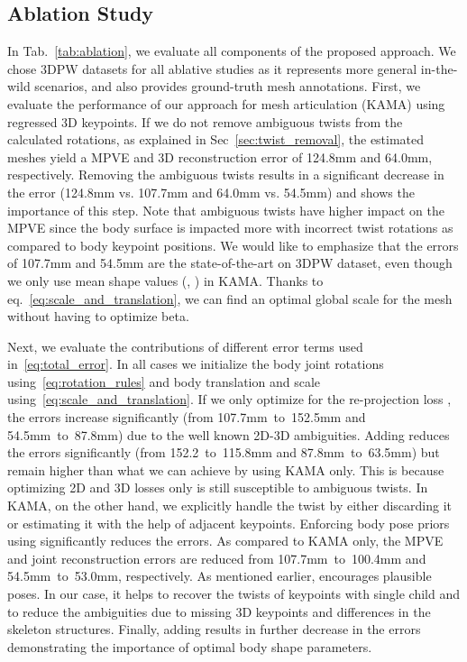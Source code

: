 \subsection{Ablation Study}
In Tab.~\ref{tab:ablation}, we evaluate all components of the proposed approach. We chose 3DPW datasets for all ablative studies as it represents more general in-the-wild scenarios, and also provides ground-truth mesh annotations. First, we evaluate the performance of our approach for mesh articulation (KAMA) using regressed 3D keypoints. If we do not remove ambiguous twists from the calculated rotations, as explained in Sec~\ref{sec:twist_removal}, the estimated meshes yield a MPVE and 3D reconstruction error of 124.8mm and 64.0mm, respectively. Removing the ambiguous twists results in a significant decrease in the error (124.8mm vs. 107.7mm and 64.0mm vs. 54.5mm) and shows the importance of this step. Note that ambiguous twists have higher impact on the MPVE since the body surface is impacted more with incorrect twist rotations as compared to body keypoint positions. We would like to emphasize that the errors of 107.7mm and 54.5mm are the state-of-the-art on 3DPW dataset, even though we only use mean shape values (\ie, ) in KAMA. Thanks to eq.~\eqref{eq:scale_and_translation}, we can find an optimal global scale for the mesh without having to optimize beta. 


Next, we evaluate the contributions of different error terms used in~\eqref{eq:total_error}. In all cases we initialize the body joint rotations using~\eqref{eq:rotation_rules} and body translation and scale using~\eqref{eq:scale_and_translation}. If we only optimize for the re-projection loss , the errors increase significantly (from 107.7mm~to~152.5mm and 54.5mm~to~87.8mm) due to the well known 2D-3D ambiguities. Adding  reduces the errors significantly (from 152.2~to~115.8mm and 87.8mm~to~63.5mm)  but remain higher than what we can achieve by using KAMA only. This is because optimizing 2D and 3D losses only is still susceptible to ambiguous twists. In KAMA, on the other hand, we explicitly handle the twist by either discarding it or estimating it with the help of adjacent keypoints. Enforcing body pose priors using  significantly reduces the errors. As compared to KAMA only, the MPVE and joint reconstruction errors are reduced from 107.7mm~to~100.4mm and 54.5mm~to~53.0mm, respectively.  As mentioned earlier,  encourages plausible poses. In our case, it helps to recover the twists of keypoints with single child and to reduce the ambiguities due to missing 3D keypoints and differences in the skeleton structures. Finally, adding  results in further decrease in the errors demonstrating the importance of optimal body shape parameters. 

